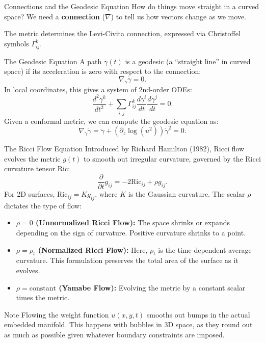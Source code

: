 \documentclass[aspectratio=1610,10pt]{beamer}
\begin{document}
  \begin{frame}{Connections and the Geodesic Equation}
    How do things move straight in a curved space? We need a \textbf{connection} ($\nabla$) to tell us how vectors change as we move.

    The metric determines the Levi-Civita connection, expressed via Christoffel symbols $\Gamma_{ij}^k$.

    \begin{block}{The Geodesic Equation}
      A path $\gamma(t)$ is a geodesic (a ``straight line'' in curved space) if its acceleration is zero with respect to the connection:
      \[%
        \nabla_{\dot{\gamma}} \dot{\gamma} = 0
      .\]%
      In local coordinates, this gives a system of 2nd-order ODEs:
      \[%
        \frac{d^2 \gamma^k}{dt^2} + \sum_{i,j} \Gamma_{ij}^k \frac{d\gamma^i}{dt} \frac{d\gamma^j}{dt} = 0
      .\]%
      Given a conformal metric, we can compute the geodesic equation as:
      \[%
        \nabla_{\dot{\gamma}} \dot{\gamma} = \ddot{\gamma} + \left(\partial_z \log(u^2)\right) \dot{\gamma}^2 = 0
      .\]%
    \end{block}
  \end{frame}

  \begin{frame}{The Ricci Flow Equation}
    Introduced by Richard Hamilton (1982), Ricci flow evolves the metric $g(t)$ to smooth out irregular curvature, governed by the Ricci curvature tensor $\text{Ric}$:
    \[%
      \frac{\partial}{\partial t} g_{ij} = -2\text{Ric}_{ij} + \rho g_{ij}
    .\]%
    For 2D surfaces, $\text{Ric}_{ij} = K g_{ij}$, where $K$ is the Gaussian curvature. The scalar $\rho$ dictates the type of flow:

    \begin{itemize}[<+->]
      \item \textbf{$\rho = 0$ (Unnormalized Ricci Flow):} The space shrinks or expands depending on the sign of curvature. Positive curvature shrinks to a point.
      \item \textbf{$\rho = \rho_t$ (Normalized Ricci Flow):} Here, $\rho_t$ is the time-dependent average curvature. This formulation preserves the total area of the surface as it evolves.
      \item \textbf{$\rho = \text{constant}$ (Yamabe Flow):} Evolving the metric by a constant scalar times the metric.
    \end{itemize}

    \begin{block}{Note}
      Flowing the weight function $u(x,y,t)$ smooths out bumps in the actual embedded manifold. This happens with bubbles in 3D space, as they round out as much as possible given whatever boundary constraints are imposed.
    \end{block}
  \end{frame}
\end{document}

